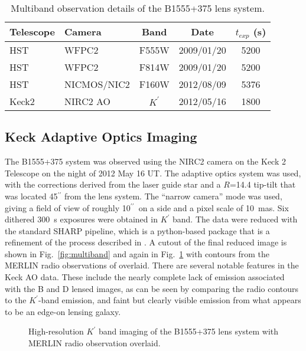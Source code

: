 \documentclass[useAMS,usenatbib]{mn2e}
\begin{document}
\begin{table}
 \centering
  \caption{Multiband observation details of the B1555+375 lens system.}
  \begin{tabular}{@{}llccc}
  
\hline
  Telescope     &      Camera     &  Band & Date &$t_{exp}$ (s) \\

 \hline
   HST				&		WFPC2    &  F555W		&	2009/01/20	&	5200\\
   HST				&		WFPC2    &  F814W		&	2009/01/20&	5200\\
   HST				&		NICMOS/NIC2	&	F160W	&	2012/08/09 & 5376\\
   Keck2			&		NIRC2 AO	&   $K^\prime$	& 2012/05/16	&  1800\\
   \hline
\end{tabular}
\end{table}

\subsection{Keck Adaptive Optics Imaging}

The B1555+375 system was observed using the NIRC2 camera on the Keck 2
Telescope on the night of 2012 May 16 UT.  The adaptive optics system
was used, with the corrections derived from the laser guide star and a
$R$=14.4 tip-tilt that was located 45$^{\prime\prime}$ from the lens
system.  The ``narrow camera'' mode was used, giving a field of view
of roughly 10$^{\prime\prime}$\ on a side and a pixel scale of 10~mas.
Six dithered 300~s exposures were obtained in $K^{\prime}$ band.  The
data were reduced with the standard SHARP pipeline, which is a
python-based package that is a refinement of the process described in
\citet{Auger_EELS1}.  A cutout of the final reduced image is shown in
Fig.~\ref{fig:multiband} and again in Fig.~\ref{fig:merlin} with
contours from the MERLIN radio observations of \citet{Marlow}
overlaid.  There are several notable features in the Keck AO data.
These include the nearly complete lack of emission associated with the
B and D lensed images, as can be seen by comparing the radio contours
to the $K^\prime$-band emission, and faint but clearly visible
emission from what appears to be an edge-on lensing galaxy.

\begin{figure}
\caption{High-resolution  $K^\prime$ band imaging of the B1555+375 lens system with MERLIN radio observation overlaid.
%
\label{fig:merlin}}
\end{figure}
\end{document}
